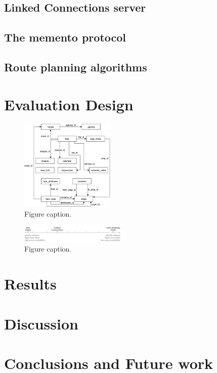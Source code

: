 \documentclass[sw]{iosart2x}
\begin{document}
\subsection{Linked Connections server}

\subsection{The memento protocol}

\subsection{Route planning algorithms}

\section{Evaluation Design}


\begin{figure}[t]
\includegraphics[width=0.4\textwidth]{images/gtfsmodel.png}
\caption{Figure caption.}\label{f1}
\end{figure}

\begin{figure}[t]
	\includegraphics[width=0.45\textwidth]{images/lc.png}
	\caption{Figure caption.}\label{f2}
\end{figure}

\section{Results}

\section{Discussion}

\section{Conclusions and Future work}
\end{document}
